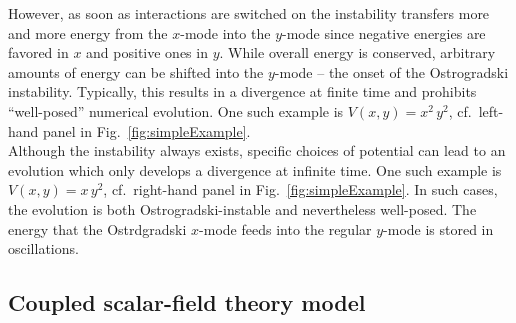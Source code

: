 \documentclass[a4paper,oneside,openany,11pt]{memoir}
\numberwithin{equation}{section} %
\begin{document}
However, as soon as interactions are switched on the instability transfers more and more energy from the $x$-mode into the $y$-mode since negative energies are favored in $x$ and positive ones in $y$. While overall energy is conserved, arbitrary amounts of energy can be shifted into the $y$-mode -- the onset of the Ostrogradski instability. Typically, this results in a divergence at finite time and prohibits ``well-posed'' numerical evolution. One such example is $V(x,y) = x^2\,y^2$, cf.~left-hand panel in Fig.~\ref{fig:simpleExample}.
\\
Although the instability always exists, specific choices of potential can lead to an evolution which only develops a divergence at infinite time. One such example is $V(x,y) = x\,y^2$, cf.~right-hand panel in Fig.~\ref{fig:simpleExample}. In such cases, the evolution is both Ostrogradski-instable and nevertheless well-posed. The energy that the Ostrdgradski $x$-mode feeds into the regular $y$-mode is stored in oscillations.

\subsection{Coupled scalar-field theory model}
\end{document}
